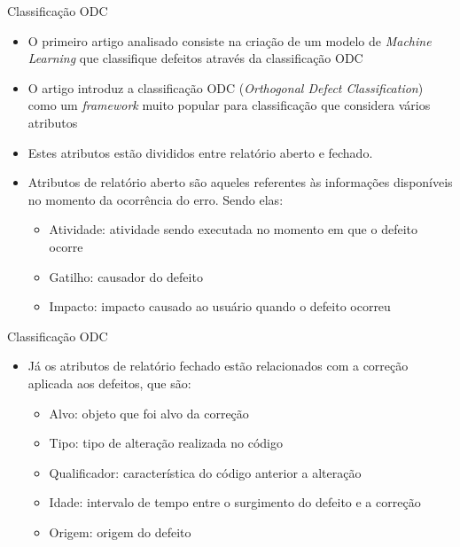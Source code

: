 \documentclass[brazilian]{beamer}
\begin{document}
\begin{frame}{Classificação ODC}
    \begin{itemize}
        \item O primeiro artigo analisado \cite{automatic_odc_using_ml} consiste na criação de um modelo de \emph{Machine Learning} que classifique defeitos através da classificação ODC
        \item O artigo introduz a classificação ODC (\textit{Orthogonal Defect Classification}) como um \textit{framework} muito popular para classificação que considera vários atributos
        \item Estes atributos estão divididos entre relatório aberto e fechado. 
        \item Atributos de relatório aberto são aqueles referentes às informações disponíveis no momento da ocorrência do erro. Sendo elas:
        \begin{itemize}
            \item Atividade: atividade sendo executada no momento em que o defeito ocorre
            \item Gatilho: causador do defeito
            \item Impacto: impacto causado ao usuário quando o defeito ocorreu
        \end{itemize}
    \end{itemize}
\end{frame}

\begin{frame}{Classificação ODC}
    \begin{itemize}
        \item Já os atributos de relatório fechado estão relacionados com a correção aplicada aos defeitos, que são:
        \begin{itemize}
            \item Alvo: objeto que foi alvo da correção
            \item Tipo: tipo de alteração realizada no código
            \item Qualificador: característica do código anterior a alteração
            \item Idade: intervalo de tempo entre o surgimento do defeito e a correção
            \item Origem: origem do defeito
        \end{itemize}
    \end{itemize}
\end{frame}
\end{document}
